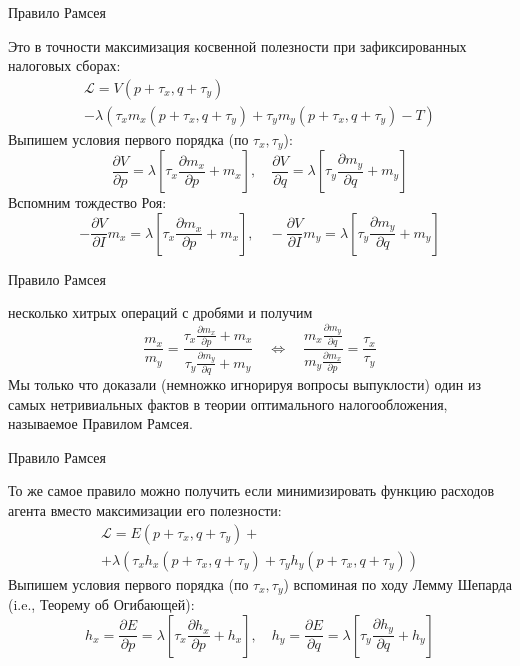 \documentclass{beamer}
\begin{document}
\begin{frame}{Правило Рамсея}

Это в точности максимизация косвенной полезности при зафиксированных налоговых сборах:
\begin{gather*}
\mathcal{L} = V(p+\tau_x,q+\tau_y) \\ - \lambda (\tau_x m_x(p+ \tau_x,q+\tau_y) + \tau_y m_y(p+ \tau_x,q+\tau_y) - T)
\end{gather*}
Выпишем условия первого порядка (по $\tau_x, \tau_y$):
$$\frac{\partial V}{\partial p} = \lambda [\tau_x \frac{\partial m_x}{\partial p} + m_x], \quad \frac{\partial V}{\partial q} = \lambda [\tau_y \frac{\partial m_y}{\partial q}+m_y]$$
Вспомним тождество Роя:
$$-\frac{\partial V}{\partial I}m_x = \lambda [\tau_x \frac{\partial m_x}{\partial p}+m_x], \quad -\frac{\partial V}{\partial I}m_y = \lambda [\tau_y \frac{\partial m_y}{\partial q}+m_y]$$
\end{frame}

\begin{frame}{Правило Рамсея}

несколько хитрых операций с дробями и получим
$$ \frac{m_x}{m_y} = \frac{\tau_x \frac{\partial m_x}{\partial p} + m_x}{\tau_y \frac{\partial m_y}{\partial q}+m_y} \quad \Leftrightarrow \quad \frac{m_x \frac{\partial m_y}{\partial q}}{m_y \frac{\partial m_x}{\partial p}} = \frac{\tau_x}{\tau_y}$$
Мы только что доказали (немножко игнорируя вопросы выпуклости) один из самых нетривиальных фактов в теории оптимального налогообложения, называемое Правилом Рамсея.

\end{frame}

\begin{frame}{Правило Рамсея}

То же самое правило можно получить если минимизировать функцию расходов агента вместо максимизации его полезности:
\begin{gather*}
\mathcal{L} = E(p+ \tau_x,q+\tau_y) + \\ + \lambda (\tau_x h_x(p+ \tau_x,q+\tau_y) + \tau_y h_y(p+ \tau_x,q+\tau_y))
\end{gather*}
Выпишем условия первого порядка (по $\tau_x, \tau_y$) вспоминая по ходу Лемму Шепарда (i.e., Теорему об Огибающей):
$$h_x = \frac{\partial E}{\partial p} = \lambda [\tau_x \frac{\partial h_x}{\partial p}+h_x], \quad h_y = \frac{\partial E}{\partial q} = \lambda [\tau_y \frac{\partial h_y}{\partial q}+h_y]$$

\end{frame}
\end{document}
